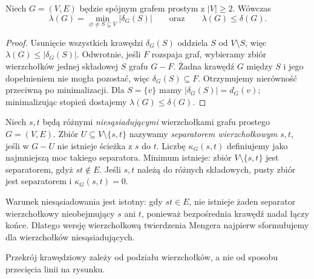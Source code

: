 \begin{stwierdzenie}
\label{prop:tg-lambda-cut}
Niech $G=(V,E)$ będzie spójnym grafem prostym z $|V|\ge2$.
Wówczas
\[
\lambda(G)=\min_{\varnothing\ne S\subsetneq V}|\delta_G(S)|
\qquad\text{oraz}\qquad \lambda(G)\le \delta(G).
\]
\end{stwierdzenie}

\begin{proof}
Usunięcie wszystkich krawędzi $\delta_G(S)$ oddziela
$S$ od $V\setminus S$, więc
$\lambda(G)\le|\delta_G(S)|$.
Odwrotnie, jeśli $F$ rozspaja graf, wybieramy zbiór
wierzchołków jednej składowej $S$ grafu $G-F$.
Żadna krawędź $G$ między $S$ i jego dopełnieniem
nie mogła pozostać, więc $\delta_G(S)\subseteq F$.
Otrzymujemy nierówność przeciwną po minimalizacji.
Dla $S=\{v\}$ mamy $|\delta_G(S)|=d_G(v)$;
minimalizując stopień dostajemy $\lambda(G)\le\delta(G)$.
\end{proof}

\begin{definicja}
Niech $s,t$ będą różnymi \emph{niesąsiadującymi} wierzchołkami
grafu prostego $G=(V,E)$. Zbiór $U\subseteq V\setminus\{s,t\}$
nazywamy \emph{separatorem wierzchołkowym $s,t$}, jeśli
w $G-U$ nie istnieje ścieżka z $s$ do $t$.
Liczbę $\kappa_G(s,t)$ definiujemy jako najmniejszą
moc takiego separatora. Minimum istnieje: zbiór
$V\setminus\{s,t\}$ jest separatorem, gdyż $st\notin E$.
Jeśli $s,t$ należą do różnych składowych, pusty zbiór
jest separatorem i $\kappa_G(s,t)=0$.
\end{definicja}

Warunek niesąsiadowania jest istotny: gdy $st\in E$,
nie istnieje żaden separator wierzchołkowy nieobejmujący
$s$ ani $t$, ponieważ bezpośrednia krawędź nadal łączy końce.
Dlatego wersję wierzchołkową twierdzenia Mengera
najpierw sformułujemy dla wierzchołków niesąsiadujących.

\begin{center}

{\footnotesize Przekrój krawędziowy zależy od podziału wierzchołków,
a nie od sposobu przecięcia linii na rysunku.}
\end{center}

